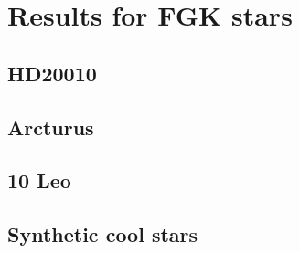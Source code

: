 \chapter{Results for FGK stars}
\label{cha:results}

\section{HD20010}


\section{Arcturus}


\section{10 Leo}


\section{Synthetic cool stars}
